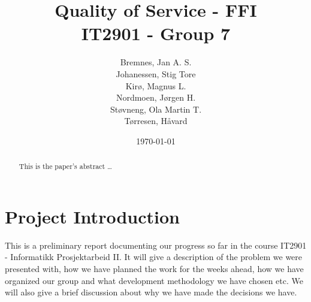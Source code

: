 \documentclass[12pt]{article}
\title{
    Quality of Service - FFI \\
    IT2901 - Group 7  \\ 
}
\author{
    Bremnes, Jan A. S. \\  
    Johanessen, Stig Tore \\
    Kirø, Magnus L.\\
    Nordmoen, Jørgen H.\\ 
    Støvneng, Ola Martin T.\\
    Tørresen, Håvard \\
}
\date{\today}
\begin{document}
\maketitle
\titlepage
{}
\newpage

\begin{abstract}\label{abstract}
This is the paper's abstract \ldots
\end{abstract}

\tableofcontents
\listoffigures
\listoftables
\newpage

\section{Project Introduction}\label{Project Introduction}
    This is a preliminary report documenting our progress so far in the course IT2901 - Informatikk Prosjektarbeid II. It will give a description of the problem we were presented with, how we have planned the work for the weeks ahead, how we have organized our group and what development methodology we have chosen etc. We will also give a brief discussion about why we have made the decisions we have.











\appendix




\end{document}
